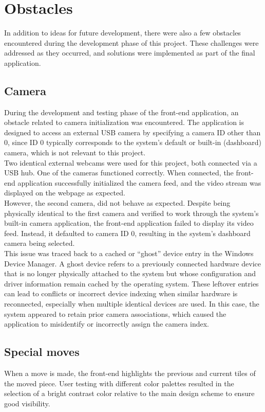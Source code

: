 \section{Obstacles}
In addition to ideas for future development, there were also a few obstacles encountered during the development phase of this project. These challenges were addressed as they occurred, and solutions were implemented as part of the final application.

\subsection{Camera}
During the development and testing phase of the front-end application, an obstacle related to camera initialization was encountered. The application is designed to access an external USB camera by specifying a camera ID other than 0, since ID 0 typically corresponds to the system's default or built-in (dashboard) camera, which is not relevant to this project.\\

Two identical external webcams were used for this project, both connected via a USB hub. One of the cameras functioned correctly. When connected, the front-end application successfully initialized the camera feed, and the video stream was displayed on the webpage as expected.\\

However, the second camera, did not behave as expected. Despite being physically identical to the first camera and verified to work through the system's built-in camera application, the front-end application failed to display its video feed. Instead, it defaulted to camera ID 0, resulting in the system's dashboard camera being selected.\\

This issue was traced back to a cached or “ghost” device entry in the Windows Device Manager. A ghost device refers to a previously connected hardware device that is no longer physically attached to the system but whose configuration and driver information remain cached by the operating system. These leftover entries can lead to conflicts or incorrect device indexing when similar hardware is reconnected, especially when multiple identical devices are used. In this case, the system appeared to retain prior camera associations, which caused the application to misidentify or incorrectly assign the camera index.

\subsection{Special moves}
When a move is made, the front-end highlights the previous and current tiles of the moved piece. User testing with different color palettes resulted in the selection of a bright contrast color relative to the main design scheme to ensure good visibility. \\

